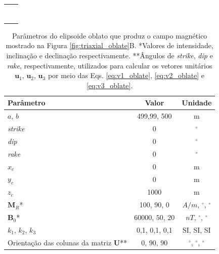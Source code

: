 \begin{table}[h!]
	\begin{center}
		\begin{tabular}{lc}
			
			&  \\
			& \\
			& \\
			&  \\
			& \\
			&  \\
			& \\
		\end{tabular}
	\end{center}
\end{table}

\begin{table}[h!]
	\begin{center}
		\begin{tabular}{|l|c|c|}
			\hline
			\textbf{Parâmetro}  & \textbf{Valor} & \textbf{Unidade} \\
			\hline 
			$a$, $b$   & 499,99, 500 & m\\
			\hline
			\textit{strike}   & $0$ & $^{\circ}$\\
			\hline
			\textit{dip}    & $0$ & $^{\circ}$\\
			\hline
			\textit{rake}   & $0$  & $^{\circ}$\\
			\hline
			$x_c$   & 0  & m\\
			\hline          
			$y_c$   & 0  & m\\
			\hline                
			$z_c$   & 1000  & m\\
			\hline
			$\mathbf{M}_{R}$*  & 100, $90$, $0$  & $A/m$, $^{\circ}$, $^{\circ}$\\
			\hline
			$\mathbf{B}_{0}$*    & 60000, $50$, $20$ & $nT$, $^{\circ}$, $^{\circ}$ \\
			\hline
			$k_{1}$, $k_{2}$, $k_{3}$   & 0,1, 0,1, 0,1 & SI, SI, SI \\
			\hline
			Orientação das colunas da matriz $\mathbf{U}$**   & $0$, $90$, $90$ & $^{\circ}$, $^{\circ}$, $^{\circ}$ \\
			\hline
		\end{tabular}
		\caption{Parâmetros do elipsoide oblato que produz o campo magnético mostrado na Figura \ref{fig:triaxial_oblate}B. *Valores de intensidade, inclinação e declinação respectivamente. **Ângulos de \textit{strike}, \textit{dip}  e \textit{rake}, respectivamente, utilizados para calcular os vetores unitários $\mathbf{u}_{1}$, $\mathbf{u}_{2}$, $\mathbf{u}_{3}$ por meio das Eqs. \ref{eq:v1_oblate}, \ref{eq:v2_oblate} e \ref{eq:v3_oblate}.}
	\end{center}
	\label{tab:triaxial_oblate2}
\end{table}

